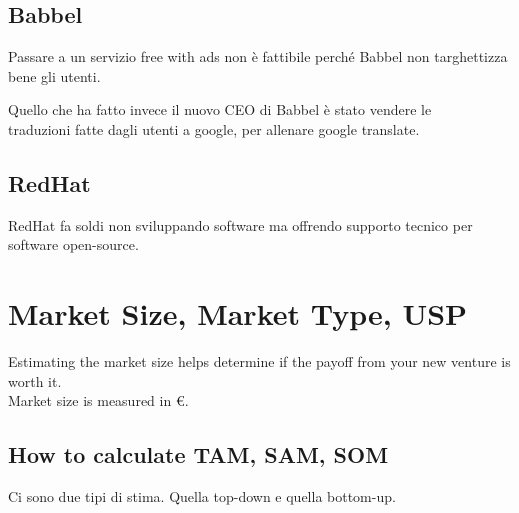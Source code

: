 \documentclass{article}
\begin{document}
\subsection{Babbel}
Passare a un servizio free with ads non è fattibile perché Babbel non targhettizza bene gli utenti.

Quello che ha fatto invece il nuovo CEO di Babbel è stato vendere le\\ traduzioni fatte dagli utenti a google, per allenare google translate.

\subsection{RedHat}
RedHat fa soldi non sviluppando software ma offrendo supporto tecnico per software open-source.

\section{Market Size, Market Type, USP}
Estimating the market size helps determine if the payoff from your new venture is worth it. \\
Market size is measured in €.

\subsection{How to calculate TAM, SAM, SOM}
Ci sono due tipi di stima. Quella top-down e quella bottom-up.
\end{document}
